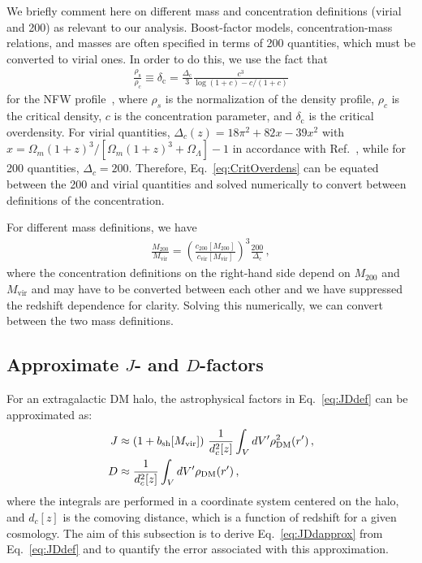 We briefly comment here on different mass and concentration definitions (virial and 200) as relevant to our analysis.   Boost-factor models, concentration-mass relations, and masses are often specified in terms of 200 quantities, which must be converted to virial ones. In order to do this, we use the fact that
\begin{equation}\begin{aligned}
\frac{\rho_\text{s}}{\rho_c} \equiv \delta_\mathrm{c} = \frac{\Delta_\text{c}}{3}\frac{c^3}{\log{(1+c)}-c/(1+c)}
\label{eq:CritOverdens}
\end{aligned}\end{equation}
for the NFW profile~\cite{Navarro:1995iw}, where $\rho_s$ is the normalization of the density profile, $\rho_c$ is the critical density, $c$ is the concentration parameter, and $\delta_\mathrm{c}$ is the critical overdensity.  For virial quantities, $\Delta_c(z) = 18\pi^2 +82x-39x^2$ with $x = \Omega_{m}(1+z)^3/[\Omega_{m}(1+z)^3 + \Omega_{\Lambda}]-1$ in accordance with Ref.~\cite{Bryan:1997dn}, while for 200 quantities, $\Delta_c = 200$.  Therefore, Eq.~\ref{eq:CritOverdens} can be equated between the 200 and virial quantities and solved numerically to convert between definitions of the concentration.

For different mass definitions, we have 
\begin{equation}\begin{aligned}
\frac{M_{200}}{M_\text{vir}} = \left(\frac{c_{200}[M_{200}]}{c_\text{vir}[M_\text{vir}]}\right)^3\frac{200}{\Delta_\text{c}} \, ,
\label{eq:MassConvert}
\end{aligned}\end{equation}
where the concentration definitions on the right-hand side depend on $M_{200}$ and $M_\text{vir}$ and may have to be converted between each other and we have suppressed the redshift dependence for clarity.  Solving this numerically, we can convert between the two mass definitions.

\subsection{Approximate $J$- and $D$-factors}

For an extragalactic DM halo, the astrophysical factors in Eq.~\ref{eq:JDdef} can be approximated as:
\begin{equation}\begin{aligned}
J &\approx \left(1+b_\text{sh}[M_\text{vir}]\right)\, \frac{1}{d_c^2[z]} \int_V dV' \rho_{\rm DM}^2(r') \,, \\
D &\approx \frac{1}{d_c^2[z]} \int_V dV' \rho_{\rm DM}(r')\,,
\vspace{0.5in}
\label{eq:JDdapprox}
\end{aligned}\end{equation}
where the integrals are performed in a coordinate system centered on the halo, and $d_c[z]$ is the comoving distance, which is a function of redshift for a given cosmology.  The aim of this subsection is to derive Eq.~\ref{eq:JDdapprox} from Eq.~\ref{eq:JDdef} and to quantify the error associated with this approximation. 

